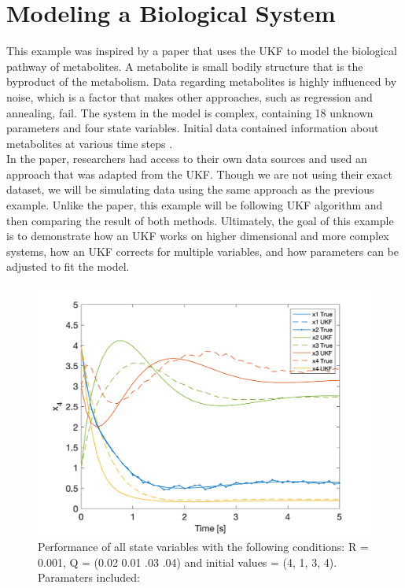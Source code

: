 \section{Modeling a Biological System }
\label{Modeling a Biological System }

This example was inspired by a paper that uses the UKF to model the biological pathway of metabolites. A metabolite is small bodily structure that is the byproduct of the metabolism. Data regarding metabolites is highly influenced by noise, which is a factor that makes other approaches, such as regression and annealing, fail. The system in the model is complex, containing 18 unknown parameters and four state variables. Initial data contained information about metabolites at various time steps \cite{article5} . \\

\noindent In the paper, researchers had access to their own data sources and used an approach that was adapted from the UKF. Though we are not using their exact dataset, we will be simulating data using the same approach as the previous example. Unlike the paper, this example will be following UKF algorithm and then comparing the result of both methods. Ultimately, the goal of this example is to demonstrate how an UKF works on higher dimensional and more complex systems, how an UKF corrects for multiple variables, and how parameters can be adjusted to fit the model. \\

\newpage

\begin{figure}[h]
    \centering
    \includegraphics[scale = 0.6]{Meskin_overall.png}
    \caption{Performance of all state variables with the following conditions: R = 0.001, Q = (0.02 0.01 .03 .04) and initial values = (4, 1, 3, 4).
    Paramaters included:  }%
    \label{map}
\end{figure}

